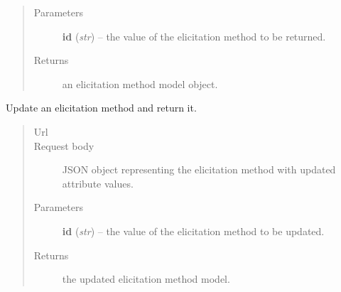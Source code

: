 \documentclass[letterpaper,10pt,english]{sphinxmanual}
\begin{document}
\begin{fulllineitems}
\begin{fulllineitems}
\begin{quote}
\begin{description}
\item[{Parameters}] \leavevmode
\textbf{id} (\emph{str}) -- the  value of the elicitation method to be returned.

\item[{Returns}] \leavevmode
an elicitation method model object.

\end{description}\end{quote}

\end{fulllineitems}


\begin{fulllineitems}
\label{api:onlinelinguisticdatabase.controllers.elicitationmethods.ElicitationmethodsController.update}
Update an elicitation method and return it.
\begin{quote}\begin{description}
\item[{Url }] \leavevmode
{}

\item[{Request body}] \leavevmode
JSON object representing the elicitation method with updated attribute values.

\item[{Parameters}] \leavevmode
\textbf{id} (\emph{str}) -- the  value of the elicitation method to be updated.

\item[{Returns}] \leavevmode
the updated elicitation method model.

\end{description}\end{quote}

\end{fulllineitems}


\end{fulllineitems}

\end{document}
